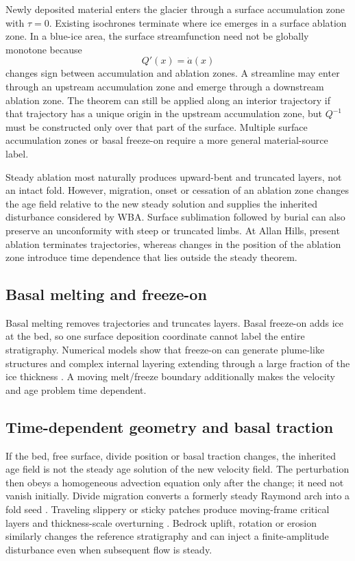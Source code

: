 \documentclass[review]{igs}
\newcommand{\parencite}{\citep}
\theoremstyle{definition}
\theoremstyle{remark}
\begin{document}
Newly deposited material enters the glacier through a surface accumulation zone with \(\tau=0\). Existing isochrones terminate where ice emerges in a surface ablation zone. In a blue-ice area, the surface streamfunction need not be globally monotone because
\begin{equation}
Q'(x)=\dot a(x)
\end{equation}
changes sign between accumulation and ablation zones. A streamline may enter through an upstream accumulation zone and emerge through a downstream ablation zone. The theorem can still be applied along an interior trajectory if that trajectory has a unique origin in the upstream accumulation zone, but \(Q^{-1}\) must be constructed only over that part of the surface. Multiple surface accumulation zones or basal freeze-on require a more general material-source label.

Steady ablation most naturally produces upward-bent and truncated layers, not an intact fold. However, migration, onset or cessation of an ablation zone changes the age field relative to the new steady solution and supplies the inherited disturbance considered by WBA. Surface sublimation followed by burial can also preserve an unconformity with steep or truncated limbs. At Allan Hills, present ablation terminates trajectories, whereas changes in the position of the ablation zone introduce time dependence that lies outside the steady theorem.

\subsection{Basal melting and freeze-on}

Basal melting removes trajectories and truncates layers. Basal freeze-on adds ice at the bed, so one surface deposition coordinate cannot label the entire stratigraphy. Numerical models show that freeze-on can generate plume-like structures and complex internal layering extending through a large fraction of the ice thickness \parencite{LeysingerVieli2018}. A moving melt/freeze boundary additionally makes the velocity and age problem time dependent.

\subsection{Time-dependent geometry and basal traction}

If the bed, free surface, divide position or basal traction changes, the inherited age field is not the steady age solution of the new velocity field. The perturbation then obeys a homogeneous advection equation only after the change; it need not vanish initially. Divide migration converts a formerly steady Raymond arch into a fold seed \parencite{JacobsonWaddington2005}. Traveling slippery or sticky patches produce moving-frame critical layers and thickness-scale overturning \parencite{Wolovick2014,WolovickCreyts2016}. Bedrock uplift, rotation or erosion similarly changes the reference stratigraphy and can inject a finite-amplitude disturbance even when subsequent flow is steady.
\end{document}
